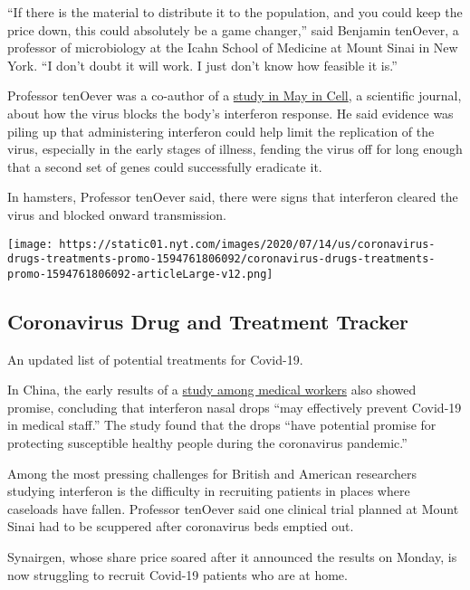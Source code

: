 ``If there is the material to distribute it to the population, and you
could keep the price down, this could absolutely be a game changer,''
said Benjamin tenOever, a professor of microbiology at the Icahn School
of Medicine at Mount Sinai in New York. ``I don't doubt it will work. I
just don't know how feasible it is.''

Professor tenOever was a co-author of a
\href{https://www.cell.com/cell/fulltext/S0092-8674(20)30489-X}{study in
May in Cell}, a scientific journal, about how the virus blocks the
body's interferon response. He said evidence was piling up that
administering interferon could help limit the replication of the virus,
especially in the early stages of illness, fending the virus off for
long enough that a second set of genes could successfully eradicate it.

In hamsters, Professor tenOever said, there were signs that interferon
cleared the virus and blocked onward transmission.

\href{https://www.nytimes.com/interactive/2020/science/coronavirus-drugs-treatments.html}{}

\texttt{[image: https://static01.nyt.com/images/2020/07/14/us/coronavirus-drugs-treatments-promo-1594761806092/coronavirus-drugs-treatments-promo-1594761806092-articleLarge-v12.png]}

\hypertarget{coronavirus-drug-and-treatment-tracker}{%
\subsection{Coronavirus Drug and Treatment
Tracker}\label{coronavirus-drug-and-treatment-tracker}}

An updated list of potential treatments for Covid-19.

In China, the early results of a
\href{https://www.medrxiv.org/content/10.1101/2020.04.11.20061473v2}{study
among medical workers} also showed promise, concluding that interferon
nasal drops ``may effectively prevent Covid-19 in medical staff.'' The
study found that the drops ``have potential promise for protecting
susceptible healthy people during the coronavirus pandemic.''

Among the most pressing challenges for British and American researchers
studying interferon is the difficulty in recruiting patients in places
where caseloads have fallen. Professor tenOever said one clinical trial
planned at Mount Sinai had to be scuppered after coronavirus beds
emptied out.

Synairgen, whose share price soared after it announced the results on
Monday, is now struggling to recruit Covid-19 patients who are at home.


